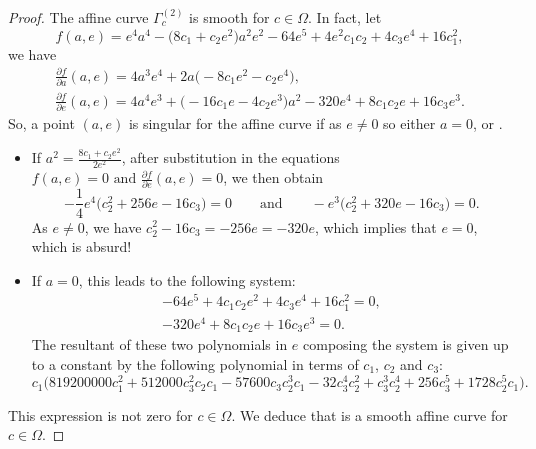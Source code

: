 \documentclass[10pt,a4paper]{amsart}
\numberwithin{equation}{section}
\begin{document}
\begin{proof}
The affine curve $ \Gamma_c^{(2)}$ is smooth for $c\in
\Omega$. In fact, let
\[f(a,e)=e^4a^4-\bigl(8c_1+c_2e^2\bigr)a^2e^2-64e^5+4e^2c_1c_2+4c_3e^4+16c_1^2, \]
we have
\begin{gather*}
 \frac{\partial f}{\partial a}(a,e) = 4a^3e^4+2a\bigl(-8c_1e^2-c_2e^4\bigr),\\
 \frac{\partial f}{\partial e}(a,e) = 4a^4e^3+\bigl(-16c_1e-4c_2e^3\bigr)a^2-320e^4+8c_1c_2e+16c_3e^3.
\end{gather*}
So, a point $(a,e)$ is singular for the affine curve  if  as $e\neq 0$ so either $a=0$,
 or .
\begin{itemize}\itemsep=0pt
 \item If $a^2=\frac{8c_1+c_2e^2}{2e^2}$, after substitution in
 the equations $f(a,e)=0 \text{ and } \frac{\partial f}{\partial
 e}(a,e)=0$, we then obtain
 \[-\frac{1}{4}e^4\bigl(c_2^2+256e-16c_3\bigr)=0 \qquad \text{and} \qquad -e^3\bigl(c_2^2+320e-16c_3 \bigr)=0.\]
As $e\neq0$, we have $c_2^2-16c_3=-256e=-320e$, which implies that
$e=0$, which is absurd!
 \item If $a=0$, this leads to the following system:
\begin{gather*}
 -64e^5+4c_1 c_2e^2+4c_3e^4+16c_1^2=0 ,\\
 -320e^4+8c_1c_2e+16c_3e^3=0.
 \end{gather*}
 The resultant of these two polynomials in $e$ composing the
system is given up to a constant by the following polynomial in
terms of $c_1$, $c_2$ and $c_3$:
\[c_1\bigl(819200000c_1^2+512000c_3^2c_2c_1-57600c_3c_2^3c_1-32c_3^4c_2^2+c_3^3c_2^4+256c_3^5+1728c_2^5c_1\bigr).
\]
\end{itemize}
This expression is not zero for $c \in \Omega$. We deduce that
 is a smooth affine curve for $c \in
\Omega$.


\end{proof}
\end{document}

